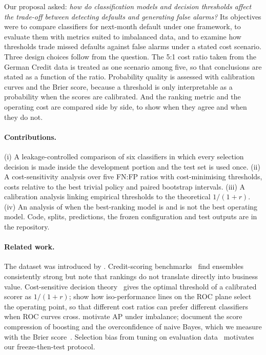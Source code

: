 \documentclass{article}
\begin{document}
Our proposal asked: \emph{how do classification models and decision thresholds affect the trade-off between detecting defaults and generating false alarms?} Its objectives were to compare classifiers for next-month default under one framework, to evaluate them with metrics suited to imbalanced data, and to examine how thresholds trade missed defaults against false alarms under a stated cost scenario. Three design choices follow from the question. The 5:1 cost ratio taken from the German Credit data is treated as one scenario among five, so that conclusions are stated as a function of the ratio. Probability quality is assessed with calibration curves and the Brier score, because a threshold is only interpretable as a probability when the scores are calibrated. And the ranking metric and the operating cost are compared side by side, to show when they agree and when they do not.

\paragraph{Contributions.} (i) A leakage-controlled comparison of six classifiers in which every selection decision is made inside the development portion and the test set is used once. (ii) A cost-sensitivity analysis over five FN:FP ratios with cost-minimising thresholds, costs relative to the best trivial policy and paired bootstrap intervals. (iii) A calibration analysis linking empirical thresholds to the theoretical $1/(1+r)$. (iv) An analysis of when the best-ranking model is and is not the best operating model. Code, splits, predictions, the frozen configuration and test outputs are in the repository.

\paragraph{Related work.} The dataset was introduced by \citet{yeh2009comparisons}. Credit-scoring benchmarks~\citep{lessmann2015benchmarking} find ensembles consistently strong but note that rankings do not translate directly into business value. Cost-sensitive decision theory~\citep{elkan2001foundations} gives the optimal threshold of a calibrated scorer as $1/(1+r)$; \citet{provost2001robust} show how iso-performance lines on the ROC plane select the operating point, so that different cost ratios can prefer different classifiers when ROC curves cross. \citet{davis2006relationship} motivate AP under imbalance; \citet{niculescu2005predicting} document the score compression of boosting and the overconfidence of naive Bayes, which we measure with the Brier score~\citep{brier1950verification}. Selection bias from tuning on evaluation data~\citep{cawley2010overfitting} motivates our freeze-then-test protocol.
\end{document}
